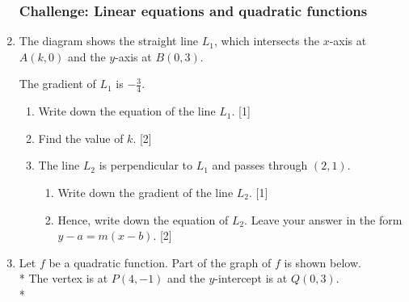 \documentclass[12pt, twoside]{article}
\begin{document}
\begin{enumerate}[itemsep=0.5cm]
\subsubsection*{Challenge: Linear equations and quadratic functions}
\item The diagram shows the straight line $L_1$, which intersects the $x$-axis at $A(k, 0)$ and the $y$-axis at $B(0,3)$.
        \begin{center}
        \end{center}
        The gradient of $L_1$ is $-\frac{3}{4}$.
        \begin{enumerate}%
            \item Write down the equation of the line $L_1$. \hfill [1]
            \item Find the value of $k$. \hfill [2]
            \item The line $L_2$ is perpendicular to $L_1$ and passes through $(2,1)$.
                \begin{enumerate}
                    \item Write down the gradient of the line $L_2$. \hfill [1]
                    \item Hence, write down the equation of $L_2$. Leave your answer in the form \\ $y-a=m(x-b)$. \hfill [2]
                \end{enumerate}
        \end{enumerate}

\newpage
  \item Let $f$ be a quadratic function. Part of the graph of $f$ is shown below.\\*
  The vertex is at $P(4,-1)$ and the $y$-intercept is at $Q(0, 3)$.\\*


\end{enumerate}
\end{document}
